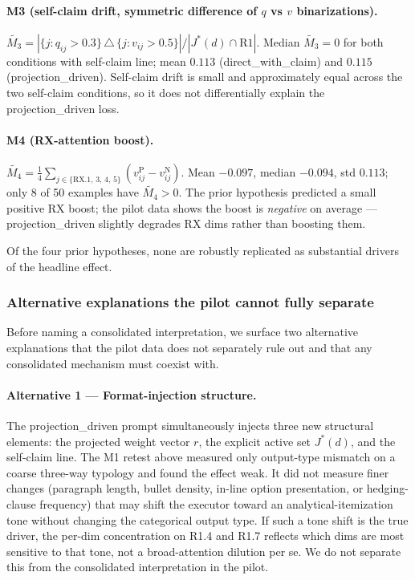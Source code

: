 \paragraph{M3 (self-claim drift, symmetric difference of $q$ vs $v$ binarizations).} $\widetilde{M_3} = |\{j: q_{ij} > 0.3\} \,\triangle\, \{j: v_{ij} > 0.5\}| / |J^*(d) \cap \text{R1}|$. Median $\widetilde{M_3} = 0$ for both conditions with self-claim line; mean $0.113$ (direct\_with\_claim) and $0.115$ (projection\_driven). Self-claim drift is small and approximately equal across the two self-claim conditions, so it does not differentially explain the projection\_driven loss.

\paragraph{M4 (RX-attention boost).} $\widetilde{M_4} = \frac{1}{4} \sum_{j \in \{\text{RX.1, 3, 4, 5}\}} (v^{\text{P}}_{ij} - v^{\text{N}}_{ij})$. Mean $-0.097$, median $-0.094$, std $0.113$; only 8 of 50 examples have $\widetilde{M_4} > 0$. The prior hypothesis predicted a small positive RX boost; the pilot data shows the boost is \emph{negative} on average --- projection\_driven slightly degrades RX dims rather than boosting them.

Of the four prior hypotheses, none are robustly replicated as substantial drivers of the headline effect.

\subsubsection{Alternative explanations the pilot cannot fully separate}
\label{sec:results:mechanism:alternatives}

Before naming a consolidated interpretation, we surface two alternative explanations that the pilot data does not separately rule out and that any consolidated mechanism must coexist with.

\paragraph{Alternative 1 --- Format-injection structure.} The projection\_driven prompt simultaneously injects three new structural elements: the projected weight vector $r$, the explicit active set $J^*(d)$, and the self-claim line. The M1 retest above measured only output-type mismatch on a coarse three-way typology and found the effect weak. It did not measure finer changes (paragraph length, bullet density, in-line option presentation, or hedging-clause frequency) that may shift the executor toward an analytical-itemization tone without changing the categorical output type. If such a tone shift is the true driver, the per-dim concentration on R1.4 and R1.7 reflects which dims are most sensitive to that tone, not a broad-attention dilution per se. We do not separate this from the consolidated interpretation in the pilot.

